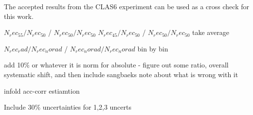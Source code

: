     The accepted results from the CLAS6 experiment  can be used as a cross check for this work. 

    \fi

    \iffalse

    $N_rec_55/N_rec_50$ / $N_rec_50/N_rec_50$
    $N_rec_45/N_rec_50$ / $N_rec_50/N_rec_50$
    take average

    $N_rec_rad/N_rec_norad$ / $N_rec_norad/N_rec_norad$ bin by bin

    add 10\% or whatever it is norm for absolute - figure out some ratio, overall systematic shift, and then include sangbaeks note about what is wrong with it

    infold acc-corr estiamtion

    Include 30\% uncertainties for 1,2,3 uncerts

